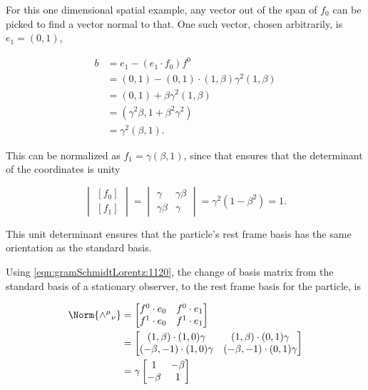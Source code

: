 For this one dimensional spatial example, any vector out of the span of $f_0$ can be picked to find a vector normal to that.  One such vector, chosen arbitrarily, is $e_1 = (0, 1)$,

\begin{align*}
b
&= e_1 - (e_1 \cdot f_0) f^0 \\
&= (0, 1) - (0, 1) \cdot (1, \beta) \gamma^2 (1, \beta) \\
&= (0, 1) + \beta \gamma^2 (1, \beta) \\
&= (\gamma^2 \beta, 1 + \beta^2 \gamma^2) \\
&= \gamma^2 (\beta, 1 ).
\end{align*}

This can be normalized as $f_1 = \gamma(\beta, 1)$, since that ensures that the determinant of the coordinates is unity

\begin{equation}\label{eqn:gramSchmidtLorentz:685}
\begin{vmatrix}
[f_0] \\
[f_1]
\end{vmatrix}
=
\begin{vmatrix}
\gamma & \gamma \beta \\
\gamma \beta & \gamma
\end{vmatrix}
=
\gamma^2 ( 1 - \beta^2)
= 1.
\end{equation}

This unit determinant ensures that the particle's rest frame basis has the same orientation as the standard basis.

Using \ref{eqn:gramSchmidtLorentz:1120}, the change of basis matrix from the standard basis of a stationary observer, to the rest frame basis for the particle, is

\begin{equation}\label{eqn:gramSchmidtLorentz:720}
\begin{aligned}
\Norm{ {\wedge^\mu}_\nu }
&=
\begin{bmatrix}
f^0 \cdot e_0
&
f^0 \cdot e_1
\\
f^1 \cdot e_0
 &
f^1 \cdot e_1
\end{bmatrix} \\
&=
\begin{bmatrix}
( 1, \beta )
\cdot
(1, 0)
\gamma &
( 1, \beta )
\cdot
(0, 1)
\gamma \\
( -\beta, -1)
\cdot
(1, 0)
\gamma &
( -\beta, -1)
\cdot
(0, 1)
\gamma
\end{bmatrix} \\
&=
\gamma
\begin{bmatrix}
1 & - \beta \\
- \beta & 1
\end{bmatrix}
\end{aligned}
\end{equation}

